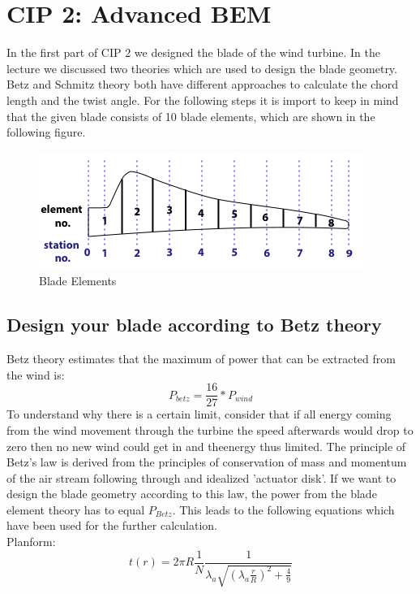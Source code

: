 \documentclass[10pt]{article}
\begin{document}
\section{CIP 2: Advanced BEM }
In the first part of CIP 2 we designed the blade of the wind turbine. In the lecture we discussed two theories which are used to design the blade geometry. Betz and Schmitz theory both have different approaches to calculate the chord length and the twist angle. For the following steps it is import to keep in mind that the given blade consists of 10 blade elements, which are shown in the following figure.
\begin{figure}[H]
\includegraphics[width=1\linewidth]{../CIP_2/Figures/blade_elements.png}
\caption{Blade Elements}
\label{fig:blade_elemets}
\end{figure}

\subsection{Design your blade according to Betz theory}
Betz theory estimates that the maximum of power that can be extracted from the wind is:
\begin{equation}
P_{betz} = \frac{16}{27}*P_{wind}
\end{equation}
To understand why there is a certain limit, consider that if all energy coming from the wind movement through the turbine the speed afterwards would drop to zero then no new wind could get in and theenergy thus limited.
The principle of Betz's law is derived from the principles of conservation of mass and momentum of the air stream following through and idealized 'actuator disk'.
If we want to design the blade geometry according to this law, the power from the blade element theory has to equal $P_{Betz}$. This leads to the following equations which have been used for the further calculation.\\

Planform:
\begin{equation}
t(r) = 2\pi R \frac{1}{N}\frac{1}{\lambda_a\sqrt{(\lambda_a\frac{r}{R})^2+\frac{4}{9}}}
\end{equation}
\end{document}
